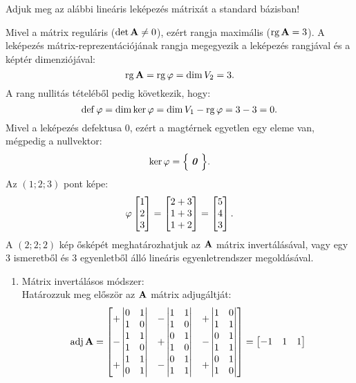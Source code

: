 \documentclass[exercise]{math-standalone}
\begin{document}
\begin{exercise}{%
    Adjuk meg az alábbi lineáris leképezés mátrixát a standard bázisban!
  }
{    Mivel a mátrix reguláris ($\det \mathbf{A} \neq 0$), ezért rangja maximális
    ($\operatorname{rg} \mathbf{A} = 3$). A leképezés mátrix-reprezentációjának rangja megegyezik
    a leképezés rangjával és a képtér dimenziójával:
    \[
      \operatorname{rg} \mathbf{A} = \operatorname{rg} \varphi = \operatorname{dim} V_2 = 3
      \text.
    \]
    A rang nullitás tételéből pedig következik, hogy:
    \[
      \operatorname{def} \varphi = \operatorname{dim} \ker \varphi = \operatorname{dim} V_1 - \operatorname{rg} \varphi = 3 - 3 = 0
      \text.
    \]
    Mivel a leképezés defektusa 0, ezért a magtérnek egyetlen egy eleme van,
    mégpedig a nullvektor:
    \[
      \ker \varphi = \Big\{\; \text{\textbf{\textit{0}}} \;\Big\}
      \text.
    \]
    Az $(1;2;3)$ pont képe:
    \[
      \varphi \begin{bmatrix}
        1 \\ 2 \\ 3
      \end{bmatrix} = \begin{bmatrix}
        2 + 3 \\
        1 + 3 \\
        1 + 2
      \end{bmatrix} = \begin{bmatrix}
        5 \\ 4 \\3
      \end{bmatrix}
      \text.
    \]
    A $(2;2;2)$ kép ősképét meghatározhatjuk az $\mathbf{A}$ mátrix invertálásával,
    vagy egy 3 ismeretből és 3 egyenletből álló lineáris egyenletrendszer
    megoldásával.
    \begin{enumerate}
      \newcommand\qadj[4]{\begin{vmatrix}#1&#2\\#3&#4\end{vmatrix}}
      \item Mátrix invertálásos módszer: \\[2mm]
            Határozzuk meg először az $\mathbf{A}$ mátrix adjugáltját:
            \[
              \adj \rmat A = \begin{bmatrix}
                +\qadj{0}{1}{1}{0} & -\qadj{1}{1}{1}{0} & +\qadj{1}{0}{1}{1} \\
                -\qadj{1}{1}{1}{0} & +\qadj{0}{1}{1}{0} & -\qadj{0}{1}{1}{1} \\
                +\qadj{1}{1}{0}{1} & -\qadj{0}{1}{1}{1} & +\qadj{0}{1}{1}{0} \\
              \end{bmatrix} = \begin{bmatrix}
                -1 & 1  & 1  \\

\end{bmatrix}\]
\end{enumerate}}
\end{exercise}
\end{document}
